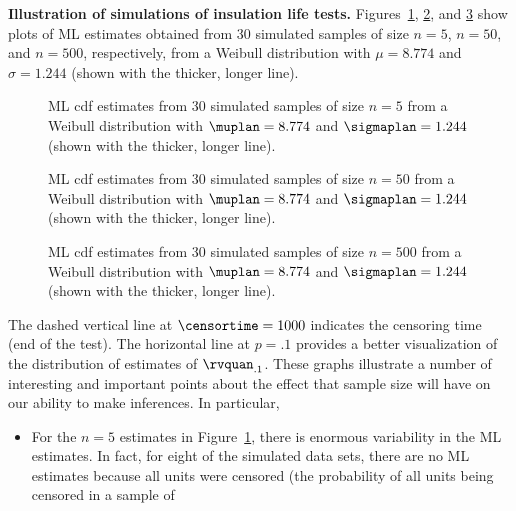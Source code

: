 \begin{example}
{\bf Illustration of simulations of insulation life tests.}
Figures~\ref{figure:test.sim.weib.n5.ps}, 
\ref{figure:test.sim.weib.n50.ps}, and
\ref{figure:test.sim.weib.n500.ps}
show plots of ML estimates obtained from 30 simulated samples of size
$n=5$, $n=50$, and $n=500$, respectively, from a Weibull
distribution with $\mu=8.774$ and $\sigma=1.244$ (shown with the
thicker, longer line).
\begin{figure}
\caption{ML cdf estimates from 30 simulated samples of size $n=5$ from
a Weibull distribution with $\muplan=8.774$ and $\sigmaplan=1.244$
(shown with the thicker, longer line).}
\label{figure:test.sim.weib.n5.ps}
\end{figure}
\begin{figure}
\caption{ML cdf estimates from 30 simulated samples of size $n=50$ from
a Weibull distribution with $\muplan=8.774$ and $\sigmaplan=1.244$
(shown with the thicker, longer line).}
\label{figure:test.sim.weib.n50.ps}
\end{figure}
\begin{figure}
\caption{ML cdf estimates from 30 simulated samples of size $n=500$ from
a Weibull distribution with $\muplan=8.774$ and $\sigmaplan=1.244$
(shown with the thicker, longer line).}
\label{figure:test.sim.weib.n500.ps}
\end{figure}
 The dashed vertical line at $\censortime=1000$ indicates the
censoring time (end of the test).  The horizontal line at $p=.1$
provides a better visualization of the distribution of estimates of
$\rvquan_{.1}$.  These graphs illustrate a number of interesting and
important points about the effect that sample size will have on our
ability to make inferences. In particular,
\begin{itemize}
\item
For the $n=5$ estimates in Figure~\ref{figure:test.sim.weib.n5.ps},
there is enormous  variability in the ML estimates.  In
fact, for eight
of the simulated data sets, there are no ML estimates because
all units were censored (the probability of all units
being censored in a sample of

\end{itemize}
\end{example}
